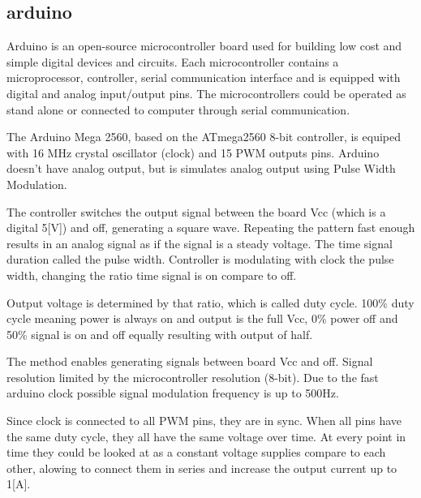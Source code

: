 \documentclass[\main/master.tex]{subfiles}
\begin{document}
\subsection{arduino}
Arduino is an open-source microcontroller board used for building low cost and simple digital devices and circuits. Each microcontroller contains a microprocessor, controller, serial communication interface and is equipped with digital and analog input/output pins. The microcontrollers could be operated as stand alone or connected to computer through serial communication. 
\par
The Arduino Mega 2560, based on the ATmega2560 8-bit controller, is equiped with 16 MHz crystal oscillator (clock) and 15 PWM outputs pins. Arduino doesn't have analog output, but is simulates analog output using Pulse Width Modulation.
\par
The controller switches the output signal between the board Vcc (which is a digital 5[V]) and off, generating a square wave.
Repeating the pattern fast enough results in an analog signal as if the signal is a steady voltage. The time signal duration called the pulse width. Controller is modulating with clock the pulse width, changing the ratio time signal is on compare to off. 
\par
Output voltage is determined by that ratio, which is called duty cycle. 100\% duty cycle meaning power is always on and output is the full Vcc, 0\% power off and 50\% signal is on and off equally resulting with output of half. 
\par
The method enables generating signals between board Vcc and off. Signal resolution limited by the microcontroller resolution (8-bit). Due to the fast arduino clock possible signal modulation frequency is up to 500Hz.
\par
Since clock is connected to all PWM pins, they are in sync. When all pins have the same duty cycle, they all have the same voltage over time. At every point in time they could be looked at as a constant voltage supplies compare to each other, alowing to connect them in series and increase the output current up to 1[A]. 
\end{document}
